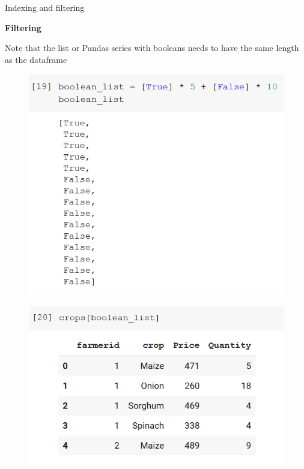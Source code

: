\documentclass[aspectratio=169]{beamer}
\begin{document}
\begin{frame}{Indexing and filtering}

	\textbf{Filtering}

	Note that the list or Pandas series with booleans needs to have the same length as the dataframe

	\begin{multicols}{2}

		\begin{figure}
			\centering
			\includegraphics[width=0.85\linewidth]{img/boolean_list.png}
		\end{figure}
		\begin{figure}
			\centering
			\includegraphics[width=\linewidth]{img/crops_filtered.png}
		\end{figure}

	\end{multicols}

\end{frame}
\end{document}
